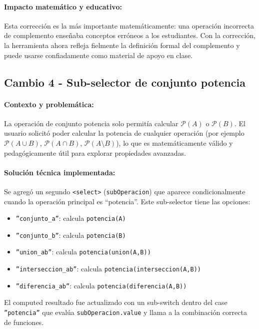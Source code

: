\documentclass[11pt,a4paper]{article}
\begin{document}
\paragraph{Impacto matemático y educativo:}
Esta corrección es la más importante matemáticamente: una operación incorrecta de complemento enseñaba conceptos erróneos a los estudiantes. Con la corrección, la herramienta ahora refleja fielmente la definición formal del complemento y puede usarse confiadamente como material de apoyo en clase.

\subsection{Cambio 4 - Sub-selector de conjunto potencia}
\paragraph{Contexto y problemática:}
La operación de conjunto potencia solo permitía calcular $\mathcal{P}(A)$ o $\mathcal{P}(B)$. El usuario solicitó poder calcular la potencia de cualquier operación (por ejemplo $\mathcal{P}(A \cup B)$, $\mathcal{P}(A \cap B)$, $\mathcal{P}(A \setminus B)$), lo que es matemáticamente válido y pedagógicamente útil para explorar propiedades avanzadas.

\paragraph{Solución técnica implementada:}
Se agregó un segundo \texttt{<select>} (\texttt{subOperacion}) que aparece condicionalmente cuando la operación principal es ``potencia''. Este sub-selector tiene las opciones:
\begin{itemize}[noitemsep]
    \item \texttt{''conjunto\_a''}: calcula \texttt{potencia(A)}
    \item \texttt{''conjunto\_b''}: calcula \texttt{potencia(B)}
    \item \texttt{''union\_ab''}: calcula \texttt{potencia(union(A,B))}
    \item \texttt{''interseccion\_ab''}: calcula \texttt{potencia(interseccion(A,B))}
    \item \texttt{''diferencia\_ab''}: calcula \texttt{potencia(diferencia(A,B))}
\end{itemize}
El computed resultado fue actualizado con un sub-switch dentro del case \texttt{''potencia''} que evalúa \texttt{subOperacion.value} y llama a la combinación correcta de funciones.
\end{document}
